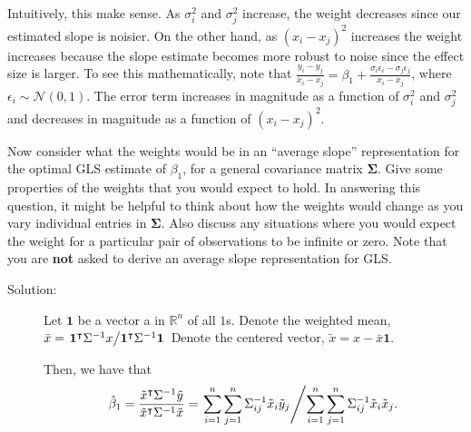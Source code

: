 \documentclass[11pt, letterpaper]{article}
\newcommand{\bSigma}{{\bm \Sigma}}
\begin{document}
{\begin{enumerate}[(a)]
\begin{description}
Intuitively, this make sense. As $\sigma_i^2$ and $\sigma_j^2$ increase, the
weight decreases since our estimated slope is noisier. On the other hand, as
$(x_i - x_j)^2$ increases the weight increases because the slope estimate
becomes more robust to noise since the effect size is larger. To see this
mathematically, note that
$\frac{y_i - y_j}{x_i - x_j} = \beta_1 + \frac{\sigma_i\epsilon_i -
  \sigma_j\epsilon_j}{x_i - x_j}$, where
$\epsilon_i \sim \mathcal{N}\left(0,1\right)$. The error term increases in
magnitude as a function of $\sigma_i^2$ and $\sigma_j^2$ and decreases in
magnitude as a function of $(x_i - x_j)^2$.
\end{description}
{\item Now consider what the weights would be in an ``average slope''
representation for the optimal GLS estimate of $\beta_1$, for a general covariance matrix $\bSigma$.  Give some properties of the weights that you would expect to hold.  In answering this question, it might be helpful to think about how the weights would change as you vary individual entries in $\bSigma$.
Also discuss any situations where you would expect the weight for a particular pair of observations to 
be infinite or zero.  Note that you are {\bf not} asked to derive an average slope representation for GLS.}

\begin{description}
\item[Solution:] Let $\mathbf{1}$ be a vector a in $\mathbb{R}^n$ of all
  $1$s. Denote the weighted mean,
  $\bar{x} =
  \left.\mathbf{1}^\intercal\Sigma^{-1}x\middle/\mathbf{1}^\intercal\Sigma^{-1}\mathbf{1}\right.$
  Denote the centered vector, $\tilde{x} = x - \bar{x}\mathbf{1}$.

  Then, we have that
  \begin{equation}
    \hat{\beta}_1 = \frac{\tilde{x}^\intercal\Sigma^{-1}\tilde{y}}{\tilde{x}^\intercal\Sigma^{-1}\tilde{x}}
    = \left.
      \sum_{i=1}^n\sum_{j=1}^n \Sigma^{-1}_{ij}\tilde{x}_i\tilde{y}_j
      \middle/
      \sum_{i=1}^n\sum_{j=1}^n \Sigma^{-1}_{ij}\tilde{x}_i\tilde{x}_j.
      \right.
    \end{equation}


\end{description}
\end{enumerate}}
\end{document}
